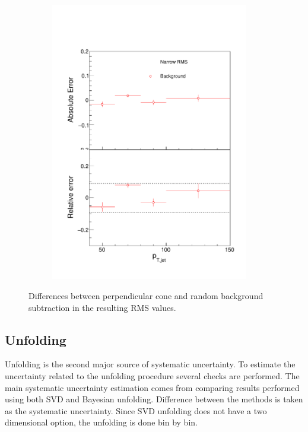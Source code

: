 \begin{figure}
\begin{subfigure}{0.44\textwidth}
\includegraphics[width=0.95\textwidth]{results/SystematicErrors/SystematicErrorsGausRMS_BgNFin00JetPt08_linx_data}
\end{subfigure}
\caption{Differences between perpendicular cone and random background subtraction in the resulting RMS values.}
\label{fig:systbg}
\end{figure}

  
  
  
  \subsection{Unfolding}
Unfolding is the second major source of systematic uncertainty. To estimate the uncertainty related to the unfolding procedure several checks are performed. The main systematic uncertainty estimation comes from comparing results performed using both SVD and Bayesian unfolding. Difference between the methods is taken as the systematic uncertainty. Since SVD unfolding does not have a two dimensional option, the unfolding is done bin by bin. %


